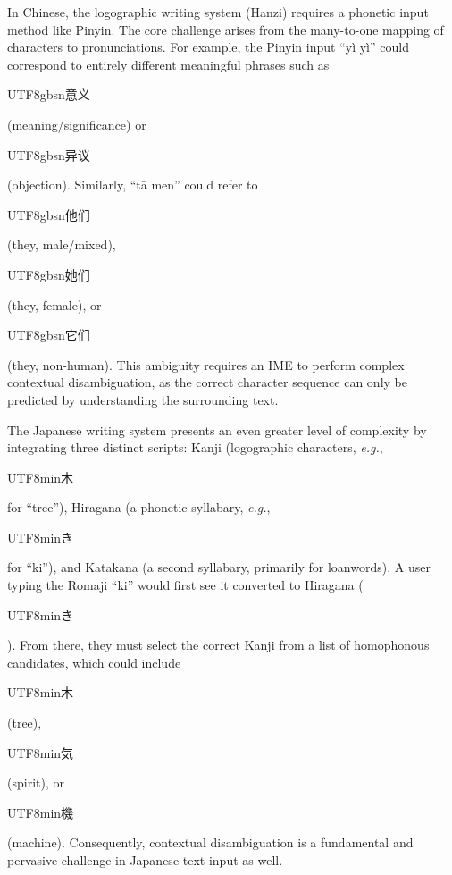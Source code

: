 \documentclass[10pt, a4paper]{article}
\begin{document}
{In Chinese,} the logographic writing system (Hanzi) requires a phonetic input method like Pinyin. The core challenge arises from the many-to-one mapping of characters to pronunciations. For example, the Pinyin input ``yì yì'' could correspond to entirely different meaningful phrases such as \begin{CJK*}{UTF8}{gbsn}意义\end{CJK*} (meaning/significance) or \begin{CJK*}{UTF8}{gbsn}异议\end{CJK*} (objection). Similarly, ``tā men'' could refer to \begin{CJK*}{UTF8}{gbsn}他们\end{CJK*} (they, male/mixed), \begin{CJK*}{UTF8}{gbsn}她们\end{CJK*} (they, female), or \begin{CJK*}{UTF8}{gbsn}它们\end{CJK*} (they, non-human). This ambiguity requires an IME to perform complex contextual disambiguation, as the correct character sequence can only be predicted by understanding the surrounding text.

{The Japanese writing system} presents an even greater level of complexity by integrating three distinct scripts: Kanji (logographic characters, \textit{e.g.}, \begin{CJK*}{UTF8}{min}木\end{CJK*} for ``tree''), Hiragana (a phonetic syllabary, \textit{e.g.}, \begin{CJK*}{UTF8}{min}き\end{CJK*} for ``ki''), and Katakana (a second syllabary, primarily for loanwords). A user typing the Romaji ``ki'' would first see it converted to Hiragana (\begin{CJK*}{UTF8}{min}き\end{CJK*}). From there, they must select the correct Kanji from a list of homophonous candidates, which could include \begin{CJK*}{UTF8}{min}木\end{CJK*} (tree), \begin{CJK*}{UTF8}{min}気\end{CJK*} (spirit), or \begin{CJK*}{UTF8}{min}機\end{CJK*} (machine). Consequently, contextual disambiguation is a fundamental and pervasive challenge in Japanese text input as well.
\end{document}

